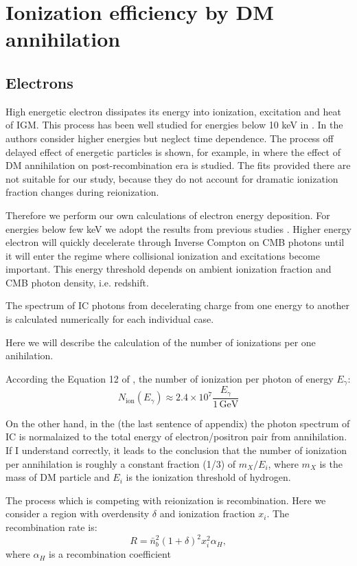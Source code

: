 \section{Ionization efficiency by DM annihilation}
\label{sec:DMspectrum}

\cite{Slatyer_2009}
\cite{H_tsi_2009}
\cite{Evoli_2013}

\subsection{Electrons}

High energetic electron dissipates its energy into ionization, excitation and heat of IGM. This process has been well studied for energies below 10 keV in \cite{Shull_1979,Shull_1985,Dalgarno_1999,Furlanetto_2010}. In \cite{Vald_s_2010} the authors consider higher energies but neglect time dependence. The process off delayed effect of energetic particles is shown, for example, in \cite{2015arXiv150603812S} where the effect of DM annihilation on post-recombination era is studied. The fits provided there are not suitable for our study, because they do not account for dramatic ionization fraction changes during reionization.

Therefore we perform our own calculations of electron energy deposition. For energies below few keV we adopt the results from previous studies \cite{Shull_1985,Furlanetto_2010}. Higher energy electron will quickly decelerate through Inverse Compton on CMB photons until it will enter the regime where collisional ionization and excitations become important. This energy threshold depends on ambient ionization fraction and CMB photon density, i.e. redshift.

The spectrum of IC photons from decelerating charge from one energy to another is calculated numerically for each individual case.

Here we will describe the calculation of the number of ionizations per one anihilation.

According the Equation 12 of \cite{Belikov_2009}, the number of ionization per photon of energy $E_\gamma$:
\begin{equation}
N_\mathrm{ion}(E_\gamma) \approx 2.4\times10^7\dfrac{E_\gamma}{1\,\mathrm{GeV}}
\end{equation}

On the other hand, in the \cite{Belikov_2010} (the last sentence of appendix) the photon spectrum of IC is normalaized to the total energy of electron/positron pair from annihilation. If I understand correctly, it leads to the conclusion that the number of ionization per annihilation is roughly a constant fraction (1/3) of $m_X/E_i$, where $m_X$ is the mass of DM particle and $E_i$ is the ionization threshold of hydrogen.


The process which is competing with reionization is recombination. Here we consider a region with overdensity $\delta$ and ionization fraction $x_i$. The recombination rate is:
\begin{equation}
R = \bar{n}_b^2 (1+\delta)^2 x_i^2 \alpha_H,
\end{equation}
where $\alpha_H$ is a recombination coefficient
  
  